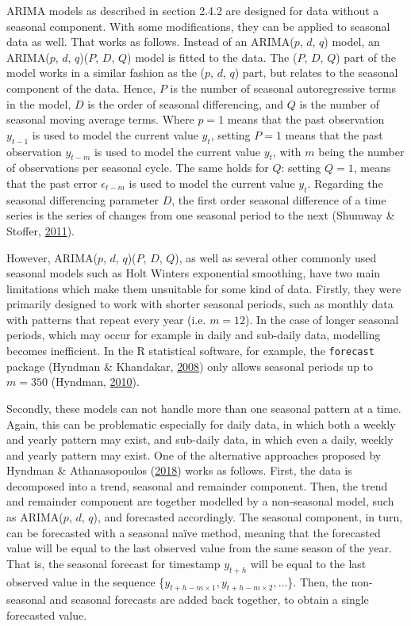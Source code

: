 \documentclass[12pt,oneside]{reedthesis}
\begin{document}
ARIMA models as described in section 2.4.2 are designed for data without
a seasonal component. With some modifications, they can be applied to
seasonal data as well. That works as follows. Instead of an ARIMA(\(p\),
\(d\), \(q\)) model, an ARIMA(\(p\), \(d\), \(q\))(\(P\), \(D\), \(Q\))
model is fitted to the data. The (\(P\), \(D\), \(Q\)) part of the model
works in a similar fashion as the (\(p\), \(d\), \(q\)) part, but
relates to the seasonal component of the data. Hence, \(P\) is the
number of seasonal autoregressive terms in the model, \(D\) is the order
of seasonal differencing, and \(Q\) is the number of seasonal moving
average terms. Where \(p = 1\) means that the past observation
\(y_{t-1}\) is used to model the current value \(y_{t}\), setting
\(P = 1\) means that the past observation \(y_{t-m}\) is used to model
the current value \(y_{t}\), with \(m\) being the number of observations
per seasonal cycle. The same holds for \(Q\): setting \(Q = 1\), means
that the past error \(\epsilon_{t-m}\) is used to model the current
value \(y_{t}\). Regarding the seasonal differencing parameter \(D\),
the first order seasonal difference of a time series is the series of
changes from one seasonal period to the next (Shumway \& Stoffer,
\protect\hyperlink{ref-shumway2011}{2011}).

However, ARIMA(\(p\), \(d\), \(q\))(\(P\), \(D\), \(Q\)), as well as
several other commonly used seasonal models such as Holt Winters
exponential smoothing, have two main limitations which make them
unsuitable for some kind of data. Firstly, they were primarily designed
to work with shorter seasonal periods, such as monthly data with
patterns that repeat every year (i.e. \(m = 12\)). In the case of longer
seasonal periods, which may occur for example in daily and sub-daily
data, modelling becomes inefficient. In the R statistical software, for
example, the \texttt{forecast} package (Hyndman \& Khandakar,
\protect\hyperlink{ref-forecast}{2008}) only allows seasonal periods up
to \(m = 350\) (Hyndman, \protect\hyperlink{ref-hyndmanblog}{2010}).

Secondly, these models can not handle more than one seasonal pattern at
a time. Again, this can be problematic especially for daily data, in
which both a weekly and yearly pattern may exist, and sub-daily data, in
which even a daily, weekly and yearly pattern may exist. One of the
alternative approaches proposed by Hyndman \& Athanasopoulos
(\protect\hyperlink{ref-hyndman2018fpp}{2018}) works as follows. First,
the data is decomposed into a trend, seasonal and remainder component.
Then, the trend and remainder component are together modelled by a
non-seasonal model, such as ARIMA(\(p\), \(d\), \(q\)), and forecasted
accordingly. The seasonal component, in turn, can be forecasted with a
seasonal naïve method, meaning that the forecasted value will be equal
to the last observed value from the same season of the year. That is,
the seasonal forecast for timestamp \(y_{t+h}\) will be equal to the
last observed value in the sequence
\{\(y_{t+h-m \times 1}, y_{t+h-m \times 2}, ...\)\}. Then, the
non-seasonal and seasonal forecasts are added back together, to obtain a
single forecasted value.
\end{document}
